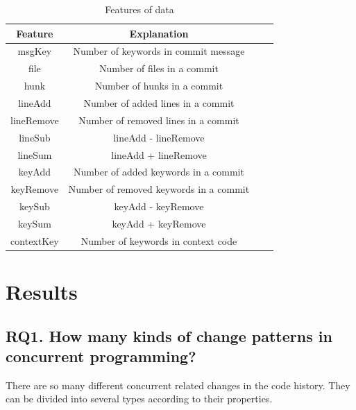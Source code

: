 \documentclass[conference]{IEEEtran}
\begin{document}
\begin{table}
	\centering
	\caption{Features of data}
	\begin{tabular}{|c|c|c|c|}\hline
		Feature&Explanation\\\hline
		msgKey&Number of keywords in commit message\\\hline
		file&Number of files in a commit\\\hline
		hunk&Number of hunks in a commit\\\hline
		lineAdd&Number of added lines in a commit\\\hline
		lineRemove&Number of removed lines in a commit\\\hline
		lineSub&lineAdd - lineRemove\\\hline
		lineSum&lineAdd + lineRemove\\\hline
		keyAdd&Number of added keywords in a commit\\\hline
		keyRemove&Number of removed keywords in a commit\\\hline
		keySub&keyAdd - keyRemove\\\hline
		keySum&keyAdd + keyRemove\\\hline
		contextKey&Number of keywords in context code\\\hline
	\end{tabular}
\end{table}

\section{Results}

\subsection{RQ1. How many kinds of change patterns in concurrent programming?}

There are so many different concurrent related changes in the code history. They can be divided into several types according to their properties.

\end{document}
